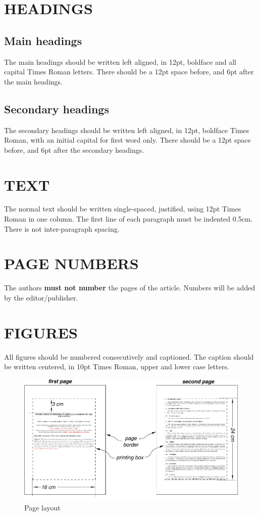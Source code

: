 \documentclass[oneside,a4paper,english,links]{amca}
\begin{document}
\section{HEADINGS}

\subsection{Main headings}

The main headings should be written left aligned, in 12pt, boldface
and all capital Times Roman letters. There should be a 12pt space
before, and 6pt after the main headings.

\subsection{Secondary headings}

The secondary headings should be written left aligned, in 12pt,
boldface Times Roman, with an initial capital for first word only. There
should be a 12pt space before, and 6pt after the secondary headings.

\section{TEXT}

The normal text should be written single-spaced, justified, using 12pt
Times Roman in one column. The first line of each paragraph must be
indented 0.5cm. There is not inter-paragraph spacing.

\section{PAGE NUMBERS}

The authors {\bf must not number} the pages of the article. Numbers will
be added by the editor/publisher. 

\section{FIGURES}

All figures should be numbered consecutively and captioned. The
caption should be written centered, in 10pt Times Roman, upper and lower
case letters.

\begin{figure}[htb]
\centerline{\includegraphics{firstpage}}
\caption{Page layout}
\label{fg:figure}
\end{figure}
\end{document}
